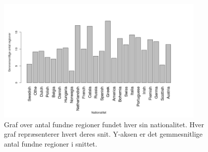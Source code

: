 \begin{figure}[!h]
	\begin{center}
		\includegraphics[angle=0,width=0.90\textwidth]{afsnit/resultater/billeder/nationcut.png}
	\end{center}
	\caption{Graf over antal fundne regioner fundet hver sin
       nationalitet. Hver graf repræsenterer hvert deres snit. Y-aksen
       er det gemmesnitlige antal fundne regioner i snittet.}
	\label{naiv_nation}
\end{figure}

